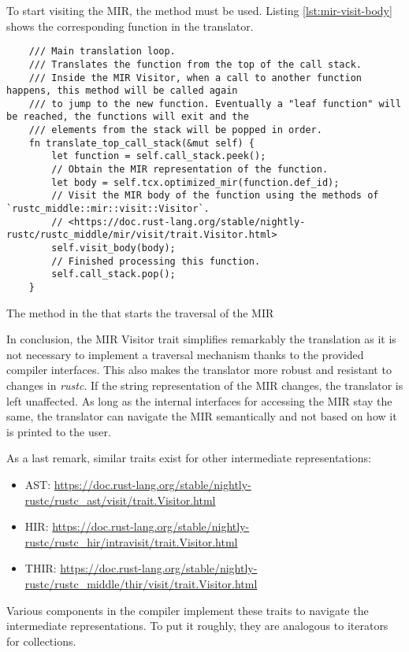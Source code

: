 To start visiting the MIR, the method  must be used.
Listing \ref{lst:mir-visit-body} shows the corresponding function in the translator.

\begin{listing}[!htb]
  \begin{verbatim}
    /// Main translation loop.
    /// Translates the function from the top of the call stack.
    /// Inside the MIR Visitor, when a call to another function happens, this method will be called again
    /// to jump to the new function. Eventually a "leaf function" will be reached, the functions will exit and the
    /// elements from the stack will be popped in order.
    fn translate_top_call_stack(&mut self) {
        let function = self.call_stack.peek();
        // Obtain the MIR representation of the function.
        let body = self.tcx.optimized_mir(function.def_id);
        // Visit the MIR body of the function using the methods of `rustc_middle::mir::visit::Visitor`.
        // <https://doc.rust-lang.org/stable/nightly-rustc/rustc_middle/mir/visit/trait.Visitor.html>
        self.visit_body(body);
        // Finished processing this function.
        self.call_stack.pop();
    }    
  \end{verbatim}
  \caption{The method in the  that starts the traversal of the \acrshort{MIR}}
  \label{lst:mir-visit-body}
\end{listing}

In conclusion, the MIR Visitor trait simplifies remarkably the translation
as it is not necessary to implement a traversal mechanism thanks to the provided
compiler interfaces.
This also makes the translator more robust and resistant to changes in \emph{rustc}.
If the string representation of the \acrshort{MIR} changes, the translator is left unaffected.
As long as the internal interfaces for accessing the MIR stay the same,
the translator can navigate the MIR semantically and not based on how it is printed to the user.

As a last remark, similar traits exist for other intermediate representations:

\begin{itemize}
  \item \acrshort{AST}: \url{https://doc.rust-lang.org/stable/nightly-rustc/rustc_ast/visit/trait.Visitor.html}
  \item \acrshort{HIR}: \url{https://doc.rust-lang.org/stable/nightly-rustc/rustc_hir/intravisit/trait.Visitor.html}
  \item \acrshort{THIR}: \url{https://doc.rust-lang.org/stable/nightly-rustc/rustc_middle/thir/visit/trait.Visitor.html}
\end{itemize}

Various components in the compiler implement these traits
to navigate the intermediate representations.
To put it roughly, they are analogous to iterators for collections.